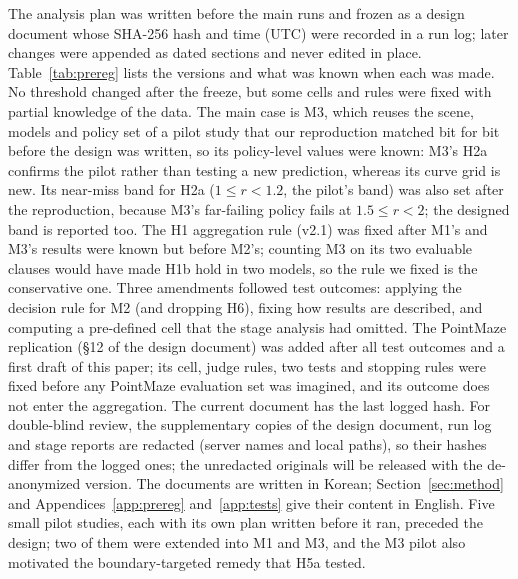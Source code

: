 \documentclass[10pt]{article}
\begin{document}
The analysis plan was written before the main runs and frozen as a design document whose SHA-256 hash and time (UTC) were recorded in a run log; later changes were appended as dated sections and never edited in place. Table~\ref{tab:prereg} lists the versions and what was known when each was made. No threshold changed after the freeze, but some cells and rules were fixed with partial knowledge of the data. The main case is M3, which reuses the scene, models and policy set of a pilot study that our reproduction matched bit for bit before the design was written, so its policy-level values were known: M3's H2a confirms the pilot rather than testing a new prediction, whereas its curve grid is new. Its near-miss band for H2a ($1\le r<1.2$, the pilot's band) was also set after the reproduction, because M3's far-failing policy fails at $1.5\le r<2$; the designed band is reported too. The H1 aggregation rule (v2.1) was fixed after M1's and M3's results were known but before M2's; counting M3 on its two evaluable clauses would have made H1b hold in two models, so the rule we fixed is the conservative one. Three amendments followed test outcomes: applying the decision rule for M2 (and dropping H6), fixing how results are described, and computing a pre-defined cell that the stage analysis had omitted. The PointMaze replication (\S12 of the design document) was added after all test outcomes and a first draft of this paper; its cell, judge rules, two tests and stopping rules were fixed before any PointMaze evaluation set was imagined, and its outcome does not enter the aggregation. The current document has the last logged hash. For double-blind review, the supplementary copies of the design document, run log and stage reports are redacted (server names and local paths), so their hashes differ from the logged ones; the unredacted originals will be released with the de-anonymized version. The documents are written in Korean; Section~\ref{sec:method} and Appendices~\ref{app:prereg} and~\ref{app:tests} give their content in English. Five small pilot studies, each with its own plan written before it ran, preceded the design; two of them were extended into M1 and M3, and the M3 pilot also motivated the boundary-targeted remedy that H5a tested.
\end{document}
